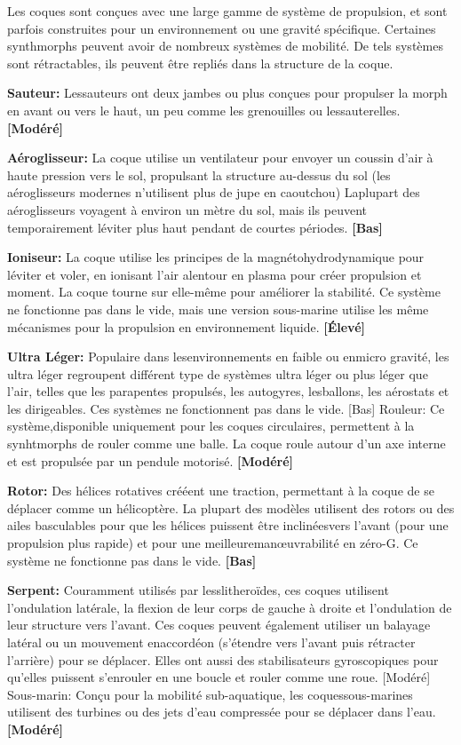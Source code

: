 Les coques sont conçues avec une large gamme de système de propulsion, et sont parfois construites pour un environnement ou une gravité spécifique. Certaines synthmorphs peuvent avoir de nombreux systèmes de mobilité. De tels systèmes sont rétractables, ils peuvent être repliés dans la structure de la coque. 

\textbf{Sauteur:} Lessauteurs ont deux jambes ou plus conçues pour propulser la morph en avant ou vers le haut, un peu comme les grenouilles ou lessauterelles. \textbf{[Modéré]} 

\textbf{Aéroglisseur:} La coque utilise un ventilateur pour envoyer un coussin d'air à haute pression vers le sol, propulsant la structure au-dessus du sol (les aéroglisseurs modernes n'utilisent plus de jupe en caoutchou) Laplupart des aéroglisseurs voyagent à environ un mètre du sol, mais ils peuvent temporairement léviter plus haut pendant de courtes périodes. \textbf{[Bas]} 

\textbf{Ioniseur:} La coque utilise les principes de la magnétohydrodynamique pour léviter et voler, en ionisant l'air alentour en plasma pour créer propulsion et moment. La coque tourne sur elle-même pour améliorer la stabilité. Ce système ne fonctionne pas dans le vide, mais une version sous-marine utilise les même mécanismes pour la propulsion en environnement liquide. \textbf{[Élevé]} 

\textbf{Ultra Léger:} Populaire dans lesenvironnements en faible ou enmicro gravité, les ultra léger regroupent différent type de systèmes ultra léger ou plus léger que l'air, telles que les parapentes propulsés, les autogyres, lesballons, les aérostats et les dirigeables. Ces systèmes ne fonctionnent pas dans le vide. [Bas] Rouleur: Ce système,disponible uniquement pour les coques circulaires, permettent à la synhtmorphs de rouler comme une balle. La coque roule autour d'un axe interne et est propulsée par un pendule motorisé. \textbf{[Modéré]} 

\textbf{Rotor:} Des hélices rotatives crééent une traction, permettant à la coque de se déplacer comme un hélicoptère. La plupart des modèles utilisent des rotors ou des ailes basculables pour que les hélices puissent être inclinéesvers l'avant (pour une propulsion plus rapide) et pour une meilleuremanœuvrabilité en zéro-G. Ce système ne fonctionne pas dans le vide. \textbf{[Bas]} 

\textbf{Serpent:} Couramment utilisés par lesslitheroïdes, ces coques utilisent l'ondulation latérale, la flexion de leur corps de gauche à droite et l'ondulation de leur structure vers l'avant. Ces coques peuvent également utiliser un balayage latéral ou un mouvement enaccordéon (s'étendre vers l'avant puis rétracter l'arrière) pour se déplacer. Elles ont aussi des stabilisateurs gyroscopiques pour qu'elles puissent s'enrouler en une boucle et rouler comme une roue. [Modéré] Sous-marin: Conçu pour la mobilité sub-aquatique, les coquessous-marines utilisent des turbines ou des jets d'eau compressée pour se déplacer dans l'eau. \textbf{[Modéré]} 

